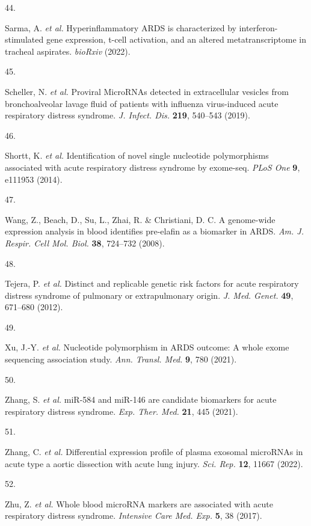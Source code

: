 \documentclass[
  11,
  a4paper,
]{article}
\newlength{\cslhangindent}
\newlength{\csllabelwidth}
\newenvironment{CSLReferences}[2] %
 {\begin{list}{}{%
  \setlength{\itemindent}{0pt}
  \setlength{\leftmargin}{0pt}
  \setlength{\parsep}{0pt}
  \ifodd #1
   \setlength{\leftmargin}{\cslhangindent}
   \setlength{\itemindent}{-1\cslhangindent}
  \fi
  \setlength{\itemsep}{#2\baselineskip}}}
 {\end{list}}
\newcommand{\CSLLeftMargin}[1]{\parbox[t]{\csllabelwidth}{\strut#1\strut}}
\newcommand{\CSLRightInline}[1]{\parbox[t]{\linewidth - \csllabelwidth}{\strut#1\strut}}
\begin{document}
\begin{CSLReferences}{0}{0}
\CSLLeftMargin{44. }%
\CSLRightInline{Sarma, A. \emph{et al.} Hyperinflammatory {ARDS} is
characterized by interferon-stimulated gene expression, t-cell
activation, and an altered metatranscriptome in tracheal aspirates.
\emph{bioRxiv} (2022).}

\CSLLeftMargin{45. }%
\CSLRightInline{Scheller, N. \emph{et al.} Proviral {MicroRNAs} detected
in extracellular vesicles from bronchoalveolar lavage fluid of patients
with influenza virus-induced acute respiratory distress syndrome.
\emph{J. Infect. Dis.} \textbf{219}, 540--543 (2019).}

\CSLLeftMargin{46. }%
\CSLRightInline{Shortt, K. \emph{et al.} Identification of novel single
nucleotide polymorphisms associated with acute respiratory distress
syndrome by exome-seq. \emph{PLoS One} \textbf{9}, e111953 (2014).}

\CSLLeftMargin{47. }%
\CSLRightInline{Wang, Z., Beach, D., Su, L., Zhai, R. \& Christiani, D.
C. A genome-wide expression analysis in blood identifies pre-elafin as a
biomarker in {ARDS}. \emph{Am. J. Respir. Cell Mol. Biol.} \textbf{38},
724--732 (2008).}

\CSLLeftMargin{48. }%
\CSLRightInline{Tejera, P. \emph{et al.} Distinct and replicable genetic
risk factors for acute respiratory distress syndrome of pulmonary or
extrapulmonary origin. \emph{J. Med. Genet.} \textbf{49}, 671--680
(2012).}

\CSLLeftMargin{49. }%
\CSLRightInline{Xu, J.-Y. \emph{et al.} Nucleotide polymorphism in
{ARDS} outcome: A whole exome sequencing association study. \emph{Ann.
Transl. Med.} \textbf{9}, 780 (2021).}

\CSLLeftMargin{50. }%
\CSLRightInline{Zhang, S. \emph{et al.} miR-584 and miR-146 are
candidate biomarkers for acute respiratory distress syndrome. \emph{Exp.
Ther. Med.} \textbf{21}, 445 (2021).}

\CSLLeftMargin{51. }%
\CSLRightInline{Zhang, C. \emph{et al.} Differential expression profile
of plasma exosomal {microRNAs} in acute type a aortic dissection with
acute lung injury. \emph{Sci. Rep.} \textbf{12}, 11667 (2022).}

\CSLLeftMargin{52. }%
\CSLRightInline{Zhu, Z. \emph{et al.} Whole blood {microRNA} markers are
associated with acute respiratory distress syndrome. \emph{Intensive
Care Med. Exp.} \textbf{5}, 38 (2017).}


\end{CSLReferences}
\end{document}

